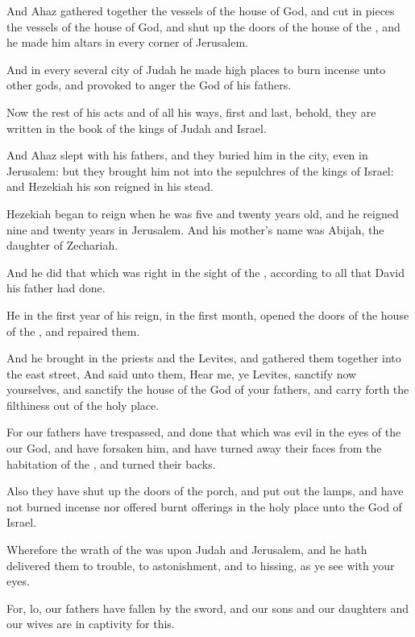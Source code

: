 \Verse And Ahaz gathered together the vessels of the house of God, and cut in pieces the vessels of the house of God, and shut up the doors of the house of the \LORD, and he made him altars in every corner of Jerusalem.

\Verse And in every several city of Judah he made high places to burn incense unto other gods, and provoked to anger the \LORD God of his fathers.

\Verse Now the rest of his acts and of all his ways, first and last, behold, they are written in the book of the kings of Judah and Israel.

\Verse And Ahaz slept with his fathers, and they buried him in the city, even in Jerusalem: but they brought him not into the sepulchres of the kings of Israel: and Hezekiah his son reigned in his stead.


\Chapter
\Verse Hezekiah began to reign when he was five and twenty years old, and he reigned nine and twenty years in Jerusalem. And his mother's name was Abijah, the daughter of Zechariah.

\Verse And he did that which was right in the sight of the \LORD, according to all that David his father had done.

\Verse He in the first year of his reign, in the first month, opened the doors of the house of the \LORD, and repaired them.

\Verse And he brought in the priests and the Levites, and gathered them together into the east street, \Verse And said unto them, Hear me, ye Levites, sanctify now yourselves, and sanctify the house of the \LORD God of your fathers, and carry forth the filthiness out of the holy place.

\Verse For our fathers have trespassed, and done that which was evil in the eyes of the \LORD our God, and have forsaken him, and have turned away their faces from the habitation of the \LORD, and turned their backs.

\Verse Also they have shut up the doors of the porch, and put out the lamps, and have not burned incense nor offered burnt offerings in the holy place unto the God of Israel.

\Verse Wherefore the wrath of the \LORD was upon Judah and Jerusalem, and he hath delivered them to trouble, to astonishment, and to hissing, as ye see with your eyes.

\Verse For, lo, our fathers have fallen by the sword, and our sons and our daughters and our wives are in captivity for this.

